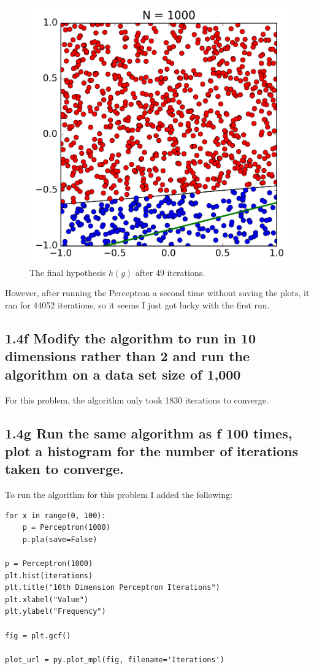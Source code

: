 \documentclass[11pt]{article}
\begin{document}
\begin{figure}[!htb]
	\includegraphics{14e.png}
	\caption{The final hypothesis $h(g)$ after 49 iterations.}
\end{figure}

However, after running the Perceptron a second time without saving the plots, it ran for 44052 iterations, so it seems I just got lucky with the first run.

\subsection*{1.4f Modify the algorithm to run in 10 dimensions rather than 2 and run the algorithm on a data set size of 1,000}

For this problem, the algorithm only took 1830 iterations to converge.
\newpage

\subsection*{1.4g Run the same algorithm as f 100 times, plot a histogram for the number of iterations taken to converge.}

To run the algorithm for this problem I added the following:

\begin{lstlisting}[frame=single]
for x in range(0, 100):
	p = Perceptron(1000)
	p.pla(save=False)

p = Perceptron(1000)
plt.hist(iterations)
plt.title("10th Dimension Perceptron Iterations")
plt.xlabel("Value")
plt.ylabel("Frequency")

fig = plt.gcf()

plot_url = py.plot_mpl(fig, filename='Iterations')
\end{lstlisting}
\end{document}
